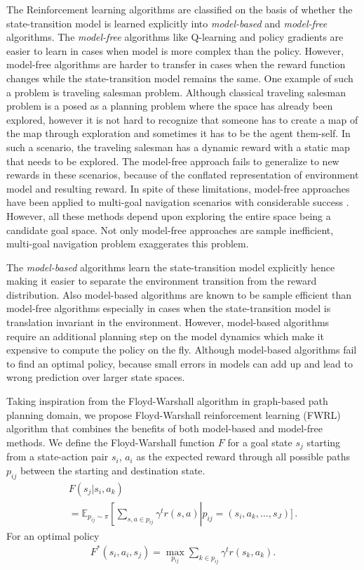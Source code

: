 \documentclass[letterpaper]{article} %
\def\state{s}
\def\act{a}
\def\E{\mathbb{E}}
\newcommand{\discount}{\gamma}
\begin{document}
The Reinforcement learning algorithms are classified on the basis of whether
the state-transition model is learned explicitly into \emph{model-based}
and \emph{model-free} algorithms.
%
The \emph{model-free} algorithms like Q-learning and policy gradients are easier to learn in cases when model is more complex than the policy.
However, model-free algorithms are harder to transfer in cases when the reward function changes while the state-transition model remains the same.
One example of such a problem is traveling salesman problem.
Although classical traveling salesman problem is a posed as a planning problem where the space has already been explored, however it is not hard to recognize that someone has to create a map of the map through exploration and sometimes it has to be the agent them-self.
In such a scenario, the traveling salesman has a dynamic reward with a static map that needs to be
explored.
The model-free approach fails to generalize to new rewards in these scenarios, because of the conflated representation of environment model and resulting reward.
In spite of these limitations, model-free approaches have been applied to multi-goal navigation
scenarios with considerable success \cite{mirowski2018learning}.
However, all these methods depend upon exploring the entire space being a candidate goal space.
Not only model-free approaches are sample inefficient, multi-goal navigation problem exaggerates this problem.

The \emph{model-based} algorithms learn the state-transition model explicitly hence making it
easier to separate the environment transition from the reward distribution. Also model-based
algorithms are known to be sample efficient than model-free algorithms especially in cases when
the state-transition model is translation invariant in the environment. 
However, model-based algorithms require an additional planning step on the model dynamics
which make it expensive to compute the policy on the fly.
Although model-based algorithms fail to find an optimal policy, because small errors in models can add up and lead to wrong prediction over larger state spaces. 

Taking inspiration from the Floyd-Warshall algorithm in graph-based path planning domain,
we propose Floyd-Warshall reinforcement learning (FWRL) algorithm that combines the
benefits of both model-based and model-free methods.
We define the Floyd-Warshall function $F$ for a goal state $\state_j$ starting from a
state-action pair $\state_i$, $\act_i$
as the expected reward through all possible paths $p_{ij}$ between the starting and
destination state.
%
\begin{multline}
F(\state_j | \state_i, \act_k) \\
= \E_{p_{ij} \sim \pi}\left[
\sum_{\state, \act \in p_{ij} } \discount^{t} r(\state, \act) \right| p_{ij} = (\state_i, \act_k, \dots, \state_J) \Biggr] \, .
\end{multline}
%
For an optimal policy
\begin{align}
F^*(\state_i, \act_i, \state_j) =
\max_{p_{ij}} \sum_{k \in p_{ij} } \discount^{t} r(\state_k, \act_k) .
\end{align}
\end{document}
